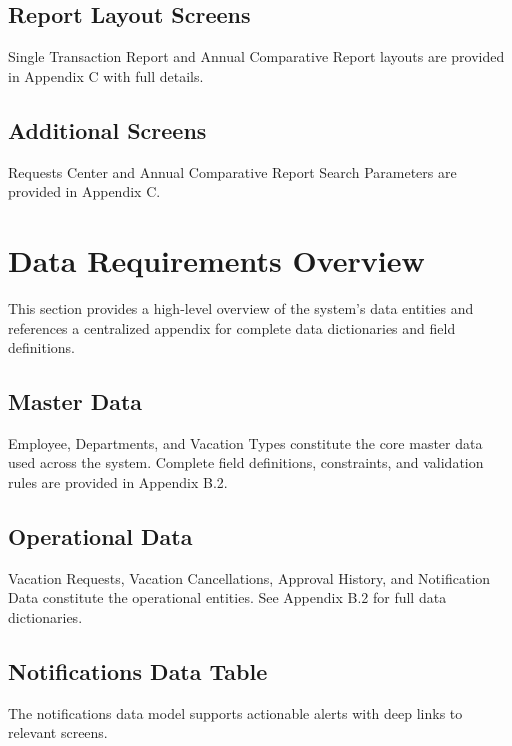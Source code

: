 \documentclass[12pt,a4paper]{article}
\begin{document}
\subsection{Report Layout Screens}
Single Transaction Report and Annual Comparative Report layouts are provided in Appendix C with full details.

\subsection{Additional Screens}
Requests Center and Annual Comparative Report Search Parameters are provided in Appendix C.

\section{Data Requirements Overview}

This section provides a high-level overview of the system's data entities and references a centralized appendix for complete data dictionaries and field definitions.

\subsection{Master Data}
Employee, Departments, and Vacation Types constitute the core master data used across the system. Complete field definitions, constraints, and validation rules are provided in Appendix B.2.

\subsection{Operational Data}
Vacation Requests, Vacation Cancellations, Approval History, and Notification Data constitute the operational entities. See Appendix B.2 for full data dictionaries.

\subsection{Notifications Data Table}
The notifications data model supports actionable alerts with deep links to relevant screens.
\end{document}

